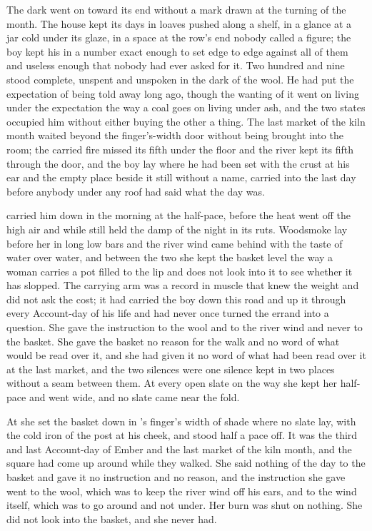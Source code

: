 The dark went on toward its end without a mark drawn at the turning of the month. The house kept its days in loaves pushed along a shelf, in a glance at a jar cold under its glaze, in a space at the row's end nobody called a figure; the boy kept his in a number exact enough to set edge to edge against all of them and useless enough that nobody had ever asked for it. Two hundred and nine stood complete, unspent and unspoken in the dark of the wool. He had put the expectation of being told away long ago, though the wanting of it went on living under the expectation the way a coal goes on living under ash, and the two states occupied him without either buying the other a thing. The last market of the kiln month waited beyond the finger's-width door without being brought into the room; the carried fire missed its fifth under the floor and the river kept its fifth through the door, and the boy lay where he had been set with the crust at his ear and the empty place beside it still without a name, carried into the last day before anybody under any roof had said what the day was.

\scenebreak

 carried him down in the morning at the half-pace, before the heat went off the high air and while  still held the damp of the night in its ruts. Woodsmoke lay before her in long low bars and the river wind came behind with the taste of water over water, and between the two she kept the basket level the way a woman carries a pot filled to the lip and does not look into it to see whether it has slopped. The carrying arm was a record in muscle that knew the weight and did not ask the cost; it had carried the boy down this road and up it through every Account-day of his life and had never once turned the errand into a question. She gave the instruction to the wool and to the river wind and never to the basket. She gave the basket no reason for the walk and no word of what would be read over it, and she had given it no word of what had been read over it at the last market, and the two silences were one silence kept in two places without a seam between them. At every open slate on the way she kept her half-pace and went wide, and no slate came near the fold.

At  she set the basket down in 's finger's width of shade where no slate lay, with the cold iron of the post at his cheek, and stood half a pace off. It was the third and last Account-day of Ember and the last market of the kiln month, and the square had come up around  while they walked. She said nothing of the day to the basket and gave it no instruction and no reason, and the instruction she gave went to the wool, which was to keep the river wind off his ears, and to the wind itself, which was to go around and not under. Her burn was shut on nothing. She did not look into the basket, and she never had.

